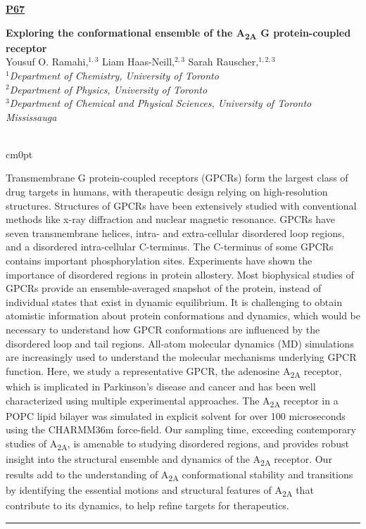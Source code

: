 \documentclass[titlepage,oneside,openany,10pt]{book}
\newenvironment{posterabswfig}[7] %
        {
	\FPeval{\cutw}{clip(16.7-#6)}
	\FPeval{\cutl}{round(#7/0.35+1,3)}
	\begin{flushright}
                \underline{\textbf{#4}}
        \end{flushright}
        \textbf{#1}\\%
        #2\\%
        \textit{#3}\\\\%
        \def\windowpagestuff{\centering
                \texttt{[image: \#5]}
	}
        \opencutright
        \begin{cutout}{0}{\cutw cm}{0pt}{\RoundingUpFunction{\cutl}}
        \noindent
	}
	{
	\end{cutout}
	\noindent\rule{15cm}{0.5pt}%
        }
\begin{document}
\newpage

\begin{posterabswfig}
	{Exploring the conformational ensemble of the A\textsubscript{2A} G protein-coupled receptor}
	{Yousuf O. Ramahi,$^{1,3}$ Liam Haas-Neill,$^{2,3}$ Sarah Rauscher,$^{1,2,3}$}
	{
	$^1$Department of Chemistry, University of Toronto\\
	$^2$Department of Physics, University of Toronto\\
	$^3$Department of Chemical and Physical Sciences, University of Toronto Mississauga
	}
	{P67}
	{abstract_figures/Ramahi_Yousuf_Poster.png}
	{10.0}
	{6.0}
	Transmembrane G protein-coupled receptors (GPCRs) form the largest class of drug targets in humans, with therapeutic design relying on high-resolution structures. Structures of GPCRs have been extensively studied with conventional methods like x-ray diffraction and nuclear magnetic resonance. GPCRs have seven transmembrane helices, intra- and extra-cellular disordered loop regions, and a disordered intra-cellular C-terminus. The C-terminus of some GPCRs contains important phosphorylation sites. Experiments have shown the importance of disordered regions in protein allostery. Most biophysical studies of GPCRs provide an ensemble-averaged snapshot of the protein, instead of individual states that exist in dynamic equilibrium. It is challenging to obtain atomistic information about protein conformations and dynamics, which would be necessary to understand how GPCR conformations are influenced by the disordered loop and tail regions. All-atom molecular dynamics (MD) simulations are increasingly used to understand the molecular mechanisms underlying GPCR function. Here, we study a representative GPCR, the adenosine A\textsubscript{2A} receptor, which is implicated in Parkinson's disease and cancer and has been well characterized using multiple experimental approaches. The A\textsubscript{2A} receptor in a POPC lipid bilayer was simulated in explicit solvent for over 100 microseconds using the CHARMM36m force-field. Our sampling time, exceeding contemporary studies of A\textsubscript{2A}, is amenable to studying disordered regions, and provides robust insight into the structural ensemble and dynamics of the A\textsubscript{2A} receptor. Our results add to the understanding of A\textsubscript{2A} conformational stability and transitions by identifying the essential motions and structural features of A\textsubscript{2A} that contribute to its dynamics, to help refine targets for therapeutics.
	\label{RamahiY}
\end{posterabswfig}
\end{document}
